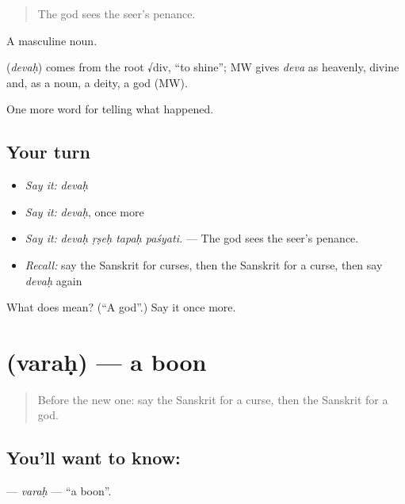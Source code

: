 \begin{quote}
The god sees the seer's penance.
\end{quote}

A masculine noun.

\begin{cousinweb}
\textbf{} (\emph{devaḥ}) comes from the root √div, \textquotedblleft{}to shine\textquotedblright{}; MW gives \emph{deva} as heavenly, divine and, as a noun, a deity, a god (MW).
\end{cousinweb}

\begin{grammarlens}[title={What you've built}]
One more word for telling what happened.
\end{grammarlens}

\subsection*{Your turn}
\begin{itemize}
\raggedright
  \item \emph{Say it:} \emph{devaḥ}
  \item \emph{Say it:} \emph{devaḥ}, once more
  \item \emph{Say it:} \emph{devaḥ ṛṣeḥ tapaḥ paśyati.} — The god sees the seer's penance.
  \item \emph{Recall:} say the Sanskrit for curses, then the Sanskrit for a curse, then say \emph{devaḥ} again
\end{itemize}

\begin{tcolorbox}[breakable,colback=teal!4,colframe=teal!35!black,title={Before you move on}]
What does  mean? (\textquotedblleft{}A god\textquotedblright{}.) Say it once more.
\end{tcolorbox}
\section[\texorpdfstring{\sk{वरः} (varaḥ)}{वरः (varaḥ)}]{ (varaḥ) — a boon}

\label{lesson:SA-C333-varah}



\begin{quote}
Before the new one: say the Sanskrit for a curse, then the Sanskrit for a god.
\end{quote}

\subsection*{You'll want to know: }
\textbf{} — \emph{varaḥ} — \textquotedblleft{}a boon\textquotedblright{}.

